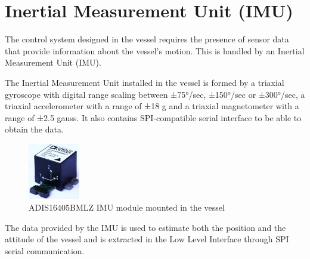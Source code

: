 \section{Inertial Measurement Unit (IMU)}\label{sec:sensors}

The control system designed in the vessel requires the presence of sensor data that provide information about the vessel's motion. This is handled by an Inertial Measurement Unit (IMU).

The Inertial Measurement Unit installed in the vessel is formed by a triaxial gyroscope with digital range scaling between ±75°/sec, ±150°/sec or ±300°/sec, a triaxial accelerometer with a range of ±18 g and a triaxial magnetometer with a range of ±\num{2.5} gauss. It also contains SPI-compatible serial interface to be able to obtain the data. \cite{IMUDatasheet}
%
\begin{figure}[H]
	\includegraphics[width=0.2\textwidth]{figures/IMU}
	\caption{ADIS16405BMLZ IMU module mounted in the vessel \cite{IMUFigure}}
	\label{fig:IMU}
\end{figure}
%
The data provided by the IMU is used to estimate both the position and the attitude of the vessel and is extracted in the Low Level Interface through SPI serial communication.


%
